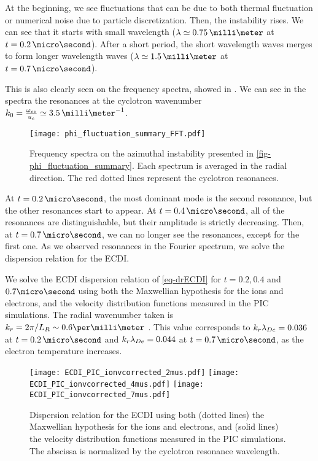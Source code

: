    At the beginning, we see fluctuations that can be due to both thermal fluctuation \citep{salpeter1960} or numerical noise due to particle discretization.
    Then, the instability rises.
    We can see that it starts with small wavelength ($\lambda \simeq 0.75\,\milli\meter$ at $t=0.2\,\micro\second$).
    After a short period, the short wavelength waves merges to form longer wavelength waves  ($\lambda \simeq 1.5\,\milli\meter$ at $t=0.7\,\micro\second$).
    
    This is also clearly seen on the frequency spectra, showed in .
    We can see in the spectra the resonances at the cyclotron wavenumber $k_0 = \frac{\oce}{u_e} \simeq 3.5\,\milli\meter^{-1}$.
    
    \begin{figure}[hbtp]
      \centering
      \texttt{[image: phi\_fluctuation\_summary\_FFT.pdf]}
      \caption{Frequency spectra on the azimuthal instability presented in \cref{fig-phi_fluctuation_summary}. Each spectrum is averaged in the radial direction. The red dotted lines represent the cyclotron resonances.}
      \label{fig-phi_fluctuation_summary_FFT}
    \end{figure}
    
    At $t=0.2\,\micro\second$, the most dominant mode is the second resonance, but the other resonances start to appear.
    At $t=0.4\,\micro\second$, all of the resonances are distinguishable, but their amplitude is strictly decreasing.
    Then, at $t=0.7\,\micro\second$, we can no longer see the resonances, except for the first one.
    As we observed resonances in the Fourier spectrum, we solve the dispersion relation for the \ac{ECDI}.
    
    \vspace{1em}
    We solve the \ac{ECDI} dispersion relation of \cref{eq-drECDI} for $t=0.2, 0.4$ and $0.7\micro\second$ using both the Maxwellian hypothesis for the ions and electrons, and the velocity distribution functions measured in the \ac{PIC} simulations.
    The radial wavenumber taken is $k_r = 2 \pi/L_R \sim 0.6 \per\milli\meter$ \citep{lafleur2016,janhunen2018}.
    This value corresponds to $k_r \lambda_{De} = 0.036$ at $t=0.2\,\micro\second$ and $k_r \lambda_{De} = 0.044$ at $t=0.7\,\micro\second$, as the electron temperature increases.
    
    \begin{figure}[hbtp]
      \centering
        \texttt{[image: ECDI\_PIC\_ionvcorrected\_2mus.pdf]} 
        \texttt{[image: ECDI\_PIC\_ionvcorrected\_4mus.pdf]} 
        \texttt{[image: ECDI\_PIC\_ionvcorrected\_7mus.pdf]} 
      \caption{Dispersion relation for the \ac{ECDI} using both (dotted lines) the Maxwellian hypothesis for the ions and electrons, and (solid lines) the velocity distribution functions measured in the \ac{PIC} simulations. The abscissa is normalized by the cyclotron resonance wavelength.}
      \label{fig-DRECDI}
    \end{figure}
    
